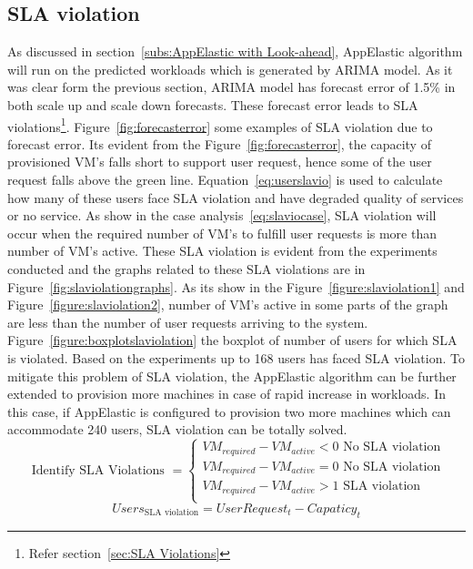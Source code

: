 \subsection{SLA violation}
\label{sub:SLA violation}
As discussed in section~\ref{subs:AppElastic with Look-ahead}, AppElastic algorithm will run on the predicted workloads which is generated by ARIMA model. As it was clear form the previous section, ARIMA model has forecast error of 1.5\% in both scale up and scale down forecasts. These forecast error leads to SLA violations\footnote{Refer section~\ref{sec:SLA Violations}}. Figure~\ref{fig:forecasterror} some examples of SLA violation due to forecast error. Its evident from the Figure~\ref{fig:forecasterror}, the capacity of provisioned VM's falls short to support user request, hence some of the user request falls above the green line. Equation~\ref{eq:userslavio} is used to calculate how many of these users face SLA violation and have degraded quality of services or no service. As show in the case analysis~\ref{eq:slaviocase}, SLA violation will occur when the required number of VM's to fulfill user requests is more than number of VM's active. These SLA violation is evident from the experiments conducted and the graphs related to these SLA violations are in Figure~\ref{fig:slaviolationgraphs}. As its show in the Figure~\ref{figure:slaviolation1} and Figure~\ref{figure:slaviolation2}, number of VM's active in some parts of the graph are less than the number of user requests arriving to the system. Figure~\ref{figure:boxplotslaviolation} the boxplot of number of users for which SLA is violated. Based on the experiments up to 168 users has faced SLA violation. To mitigate this problem of SLA violation, the AppElastic algorithm can be further extended to provision more machines in case of rapid increase in workloads. In this case, if AppElastic is configured to provision two more machines which can accommodate 240 users, SLA violation can be totally solved.
\begin{equation}
\textrm{ Identify SLA Violations }=
  \begin{cases}
    VM_{required} - VM_{active} < 0 \textrm{ No SLA violation}\\
    VM_{required} - VM_{active} = 0 \textrm{ No SLA violation}\\
    VM_{required} - VM_{active} > 1 \textrm{ SLA violation}\\
\end{cases}
\label{eq:slaviocase}
\end{equation}
\begin{equation}
Users_{\textrm{SLA violation}} = UserRequest_{t} - Capaticy_{t}
\label{eq:userslavio}
\end{equation}
